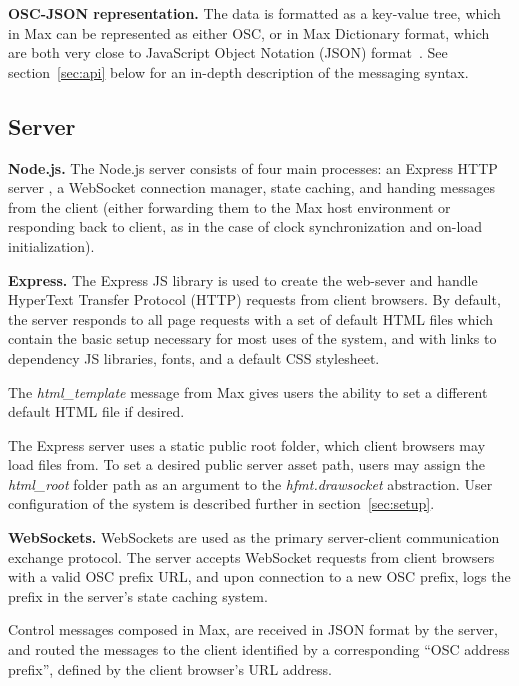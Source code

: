 \medskip
\noindent
\textbf{OSC-JSON representation.}
The \drawsocket data is formatted as a key-value tree, which in Max can be represented as either OSC, or in Max Dictionary format, which are both very close to JavaScript Object Notation (JSON) format~\cite{crockford2012json}. See section~\ref{sec:api} below for an in-depth description of the \drawsocket messaging syntax.

\subsection{Server}
\noindent
\textbf{Node.js.}
The Node.js server consists of four main processes: an Express HTTP server \cite{express}, a WebSocket \cite{websockets} connection manager, state caching, and handing messages from the client (either forwarding them to the Max host environment or responding back to client, as in the case of clock synchronization and on-load initialization).

\medskip
\noindent
\textbf{Express.}
The Express JS library is used to create the web-sever and handle HyperText Transfer Protocol (HTTP) requests from client browsers. By default, the server responds to all page requests with a set of default HTML files which contain the basic setup necessary for most uses of the \drawsocket system, and with links to dependency JS libraries, fonts, and a default CSS stylesheet.

The \textit{html\_template} message from Max gives users the ability to set a different default HTML file if desired.

The Express server uses a static public root folder, which client browsers may load files from. To set a desired public server asset path, users may assign the \textit{html\_root} folder path as an argument to the \textit{hfmt.drawsocket} abstraction. 
User configuration of the system is described further in section~\ref{sec:setup}.

\medskip
\noindent
\textbf{WebSockets.}
WebSockets are used as the primary server-client communication exchange protocol.
The server accepts WebSocket requests from client browsers with a valid OSC prefix URL, and upon connection to a new OSC prefix, logs the prefix in the server's state caching system.

Control messages composed in Max, are received in JSON format by the server, and routed the messages to the client identified by a corresponding ``OSC address prefix'', defined by the client browser's URL address.

